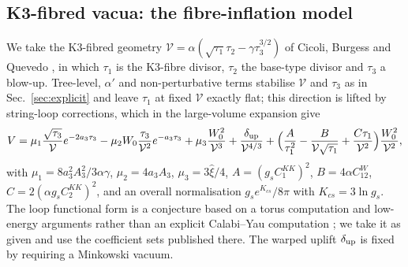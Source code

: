 \documentclass[11pt]{article}
\begin{document}
\subsection{K3-fibred vacua: the fibre-inflation model}\label{sec:k3}
We take the K3-fibred geometry $\mathcal V=\alpha(\sqrt{\tau_1}\tau_2-\gamma\tau_3^{3/2})$ of Cicoli, Burgess and Quevedo \cite{Cicoli:2008}, in which $\tau_1$ is the K3-fibre divisor, $\tau_2$ the base-type divisor and $\tau_3$ a blow-up. Tree-level, $\alpha'$ and non-perturbative terms stabilise $\mathcal V$ and $\tau_3$ as in Sec.~\ref{sec:explicit} and leave $\tau_1$ at fixed $\mathcal V$ exactly flat; this direction is lifted by string-loop corrections, which in the large-volume expansion give \cite{Cicoli:2008}
\begin{equation}
V=\mu_1\frac{\sqrt{\tau_3}}{\mathcal V}e^{-2a_3\tau_3}-\mu_2W_0\frac{\tau_3}{\mathcal V^2}e^{-a_3\tau_3}+\mu_3\frac{W_0^2}{\mathcal V^3}+\frac{\delta_{\rm up}}{\mathcal V^{4/3}}+\Big(\frac{A}{\tau_1^2}-\frac{B}{\mathcal V\sqrt{\tau_1}}+\frac{C\tau_1}{\mathcal V^2}\Big)\frac{W_0^2}{\mathcal V^2},\label{eq:k3pot}
\end{equation}
with $\mu_1=8a_3^2A_3^2/3\alpha\gamma$, $\mu_2=4a_3A_3$, $\mu_3=3\hat\xi/4$, $A=(g_sC_1^{KK})^2$, $B=4\alpha C_{12}^W$, $C=2(\alpha g_sC_2^{KK})^2$, and an overall normalisation $g_se^{K_{cs}}/8\pi$ with $K_{cs}=3\ln g_s$. The loop functional form is a conjecture based on a torus computation and low-energy arguments rather than an explicit Calabi--Yau computation \cite{Cicoli:2008}; we take it as given and use the coefficient sets published there. The warped uplift $\delta_{\rm up}$ is fixed by requiring a Minkowski vacuum.
\end{document}
